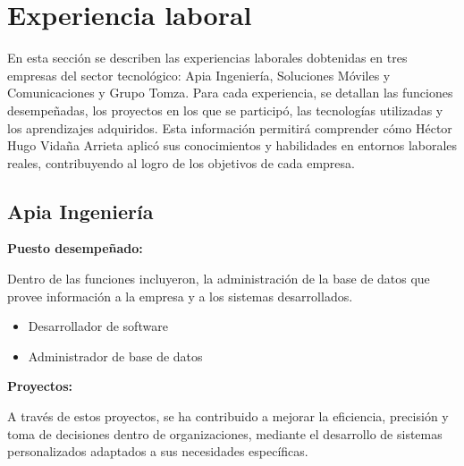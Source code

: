 \documentclass[protocolo.tex]{subfiles}
\begin{document}
\newpage 
\section{Experiencia laboral}

En esta sección se describen las experiencias laborales 
dobtenidas en tres empresas del sector tecnológico: 
Apia Ingeniería, Soluciones Móviles y Comunicaciones y Grupo Tomza. 
Para cada experiencia, se detallan las funciones desempeñadas, 
los proyectos en los que se participó, las tecnologías utilizadas y 
los aprendizajes adquiridos. Esta información permitirá comprender cómo Héctor Hugo Vidaña Arrieta aplicó sus conocimientos y habilidades en entornos laborales reales, contribuyendo al logro de los objetivos de cada empresa.

\subsection{Apia Ingeniería}

\textbf{Puesto desempeñado:} 

Dentro de las funciones incluyeron, la administración de la base de datos que provee información a la empresa y a los sistemas desarrollados.

\begin{itemize}
\item Desarrollador de software
\item Administrador de base de datos
\end{itemize}


\textbf{Proyectos:}

A través de estos proyectos, se ha contribuido a mejorar la eficiencia, precisión y toma de decisiones dentro de organizaciones, mediante el desarrollo de sistemas personalizados adaptados a sus necesidades específicas. 
\end{document}
